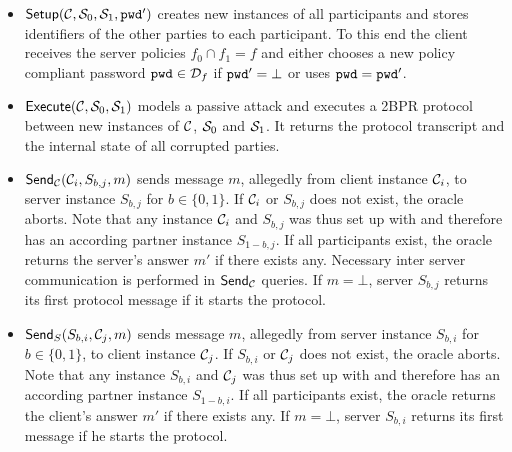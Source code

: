 \begin{itemize}
  \item $\mathsf{Setup}(\mathcal{C},\mathcal{S}_0,\mathcal{S}_1, \mathtt{pwd}')$ creates new instances of all participants and stores identifiers of the other parties to each participant.
        To this end the client receives the server policies $f_0\cap f_1=f$ and either chooses a new policy compliant password $\mathtt{pwd}\in\mathcal{D}_f$ if $\mathtt{pwd}'=\bot$ or uses $\mathtt{pwd}=\mathtt{pwd}'$.

  \item $\mathsf{Execute}(\mathcal{C},\mathcal{S}_0,\mathcal{S}_1)$ models a passive attack and executes a \ac{2BPR} protocol between new instances of $\mathcal{C}$, $\mathcal{S}_0$ and $\mathcal{S}_1$. %
        It returns the protocol transcript and the internal state of all corrupted parties.

  \item $\mathsf{Send}_\mathcal{C}(\mathcal{C}_i,S_{b,j},m)$ sends message $m$, allegedly from client instance $\mathcal{C}_i$, to server instance $S_{b,j}$ for $b\in\{0,1\}$.
        If $\mathcal{C}_i$ or $S_{b,j}$ does not exist, the oracle aborts. %
        Note that any instance $\mathcal{C}_i$ and $S_{b,j}$ was thus set up with \Setup and therefore has an according partner instance $S_{1-b,j}$.
        If all participants exist, the oracle returns the server's answer $m'$ if there exists any.
        Necessary inter server communication is performed in $\mathsf{Send}_\mathcal{C}$ queries.
        If $m=\bot$, server $S_{b,j}$ returns its first protocol message if it starts the protocol.

  \item $\mathsf{Send}_S(S_{b,i},\mathcal{C}_{j},m)$ sends message $m$, allegedly from server instance $S_{b,i}$ for $b\in\{0,1\}$, to client instance $\mathcal{C}_{j}$.
        If $S_{b,i}$ or $\mathcal{C}_j$ does not exist, the oracle aborts.
        Note that any instance $S_{b,i}$ and $\mathcal{C}_j$ was thus set up with \Setup and therefore has an according partner instance $S_{1-b,i}$.
        If all participants exist, the oracle returns the client's answer $m'$ if there exists any.
        If $m=\bot$, server $S_{b,i}$ returns its first message if he starts the protocol.


\end{itemize}
